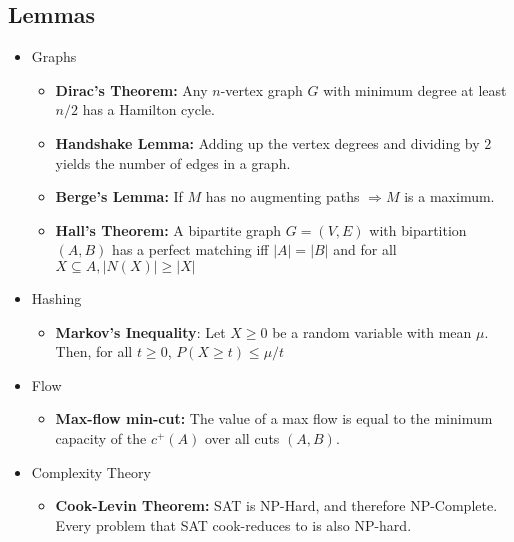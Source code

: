 \documentclass[11pt,fleqn,a4paper,titlepage,dvipsnames,cmyk]{scrartcl}
\begin{document}
\subsection{Lemmas}%
\label{sub:Lemmas}
\begin{itemize}
    \item Graphs
    \begin{itemize}
        \item \textbf{Dirac's Theorem:} Any $n$-vertex graph $G$ with
            minimum degree at least $n/2$ has a Hamilton cycle.
        \item \textbf{Handshake Lemma:} Adding up the vertex degrees and
            dividing by $2$ yields the number of edges in a graph.
        \item \textbf{Berge's Lemma:} If $M$ has no augmenting paths
            $\Rightarrow M$ is a maximum.
        \item \textbf{Hall's Theorem:} A bipartite graph $G = (V,E)$ with
            bipartition $(A,B)$ has a perfect matching iff $|A| = |B|$ and
            for all $X \subseteq A, |N(X)| \ge |X|$
    \end{itemize}
    \item Hashing
    \begin{itemize}
        \item \textbf{Markov's Inequality}: Let $X \ge 0$ be a random
            variable with mean $\mu$. Then, for all $t \ge 0$, $P(X \ge t)
            \le \mu/t$
    \end{itemize}
    \item Flow
    \begin{itemize}
        \item \textbf{Max-flow min-cut:} The value of a max flow is equal
            to the minimum capacity of the $c^+(A)$ over all cuts $(A,B)$.
    \end{itemize}
    \item Complexity Theory
    \begin{itemize}
        \item \textbf{Cook-Levin Theorem:} SAT is NP-Hard, and therefore
        NP-Complete. Every problem that SAT cook-reduces to is also
        NP-hard.
    \end{itemize}
\end{itemize}
\end{document}
